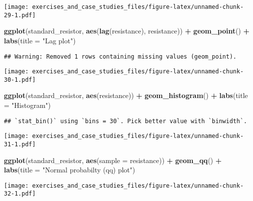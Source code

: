 \documentclass[]{book}
\newenvironment{Shaded}{\begin{snugshade}}{\end{snugshade}}
\newcommand{\DataTypeTok}[1]{\textcolor[rgb]{0.13,0.29,0.53}{#1}}
\newcommand{\KeywordTok}[1]{\textcolor[rgb]{0.13,0.29,0.53}{\textbf{#1}}}
\newcommand{\NormalTok}[1]{#1}
\newcommand{\OperatorTok}[1]{\textcolor[rgb]{0.81,0.36,0.00}{\textbf{#1}}}
\newcommand{\StringTok}[1]{\textcolor[rgb]{0.31,0.60,0.02}{#1}}
\theoremstyle{definition}
\theoremstyle{definition}
\theoremstyle{definition}
\theoremstyle{remark}
\begin{document}
\texttt{[image: exercises\_and\_case\_studies\_files/figure-latex/unnamed-chunk-29-1.pdf]}

\begin{Shaded}
\begin{Highlighting}[]
\KeywordTok{ggplot}\NormalTok{(standard_resistor, }\KeywordTok{aes}\NormalTok{(}\KeywordTok{lag}\NormalTok{(resistance), resistance)) }\OperatorTok{+}
\StringTok{  }\KeywordTok{geom_point}\NormalTok{() }\OperatorTok{+}
\StringTok{  }\KeywordTok{labs}\NormalTok{(}\DataTypeTok{title =} \StringTok{"Lag plot"}\NormalTok{)}
\end{Highlighting}
\end{Shaded}

\begin{verbatim}
## Warning: Removed 1 rows containing missing values (geom_point).
\end{verbatim}

\texttt{[image: exercises\_and\_case\_studies\_files/figure-latex/unnamed-chunk-30-1.pdf]}

\begin{Shaded}
\begin{Highlighting}[]
\KeywordTok{ggplot}\NormalTok{(standard_resistor, }\KeywordTok{aes}\NormalTok{(resistance)) }\OperatorTok{+}
\StringTok{  }\KeywordTok{geom_histogram}\NormalTok{() }\OperatorTok{+}
\StringTok{  }\KeywordTok{labs}\NormalTok{(}\DataTypeTok{title =} \StringTok{"Histogram"}\NormalTok{)}
\end{Highlighting}
\end{Shaded}

\begin{verbatim}
## `stat_bin()` using `bins = 30`. Pick better value with `binwidth`.
\end{verbatim}

\texttt{[image: exercises\_and\_case\_studies\_files/figure-latex/unnamed-chunk-31-1.pdf]}

\begin{Shaded}
\begin{Highlighting}[]
\KeywordTok{ggplot}\NormalTok{(standard_resistor, }\KeywordTok{aes}\NormalTok{(}\DataTypeTok{sample =}\NormalTok{ resistance)) }\OperatorTok{+}
\StringTok{  }\KeywordTok{geom_qq}\NormalTok{() }\OperatorTok{+}
\StringTok{  }\KeywordTok{labs}\NormalTok{(}\DataTypeTok{title =} \StringTok{"Normal probabilty (qq) plot"}\NormalTok{)}
\end{Highlighting}
\end{Shaded}

\texttt{[image: exercises\_and\_case\_studies\_files/figure-latex/unnamed-chunk-32-1.pdf]}
\end{document}

